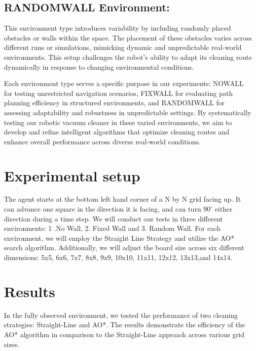 \documentclass{article}
\begin{document}
\subsection{RANDOMWALL Environment:} This environment type introduces variability by including randomly placed obstacles or walls within the space. The placement of these obstacles varies across different runs or simulations, mimicking dynamic and unpredictable real-world environments. This setup challenges the robot's ability to adapt its cleaning route dynamically in response to changing environmental conditions.


Each environment type serves a specific purpose in our experiments: NOWALL for testing unrestricted navigation scenarios, FIXWALL for evaluating path planning efficiency in structured environments, and RANDOMWALL for assessing adaptability and robustness in unpredictable settings. By systematically testing our robotic vacuum cleaner in these varied environments, we aim to develop and refine intelligent algorithms that optimize cleaning routes and enhance overall performance across diverse real-world conditions.

\section{Experimental setup}
The agent starts at the bottom left hand corner of a N by N grid facing up. 
It can advance one square in the direction it is facing, and can turn $90^\circ$ either direction during a time step. 
We will conduct our tests in three different environments: 1 .No Wall, 2. Fixed Wall and 3. Random Wall.
For each environment, we will employ the Straight Line Strategy and utilize the AO* search algorithm. Additionally, we will adjust the board size across six different dimensions: 5x5, 6x6, 7x7, 8x8, 9x9, 10x10, 11x11, 12x12, 13x13,and 14x14.

 



\section{Results}
In the fully observed environment, we tested the performance of two cleaning strategies: Straight-Line and AO*. The results demonstrate the efficiency of the AO* algorithm in comparison to the Straight-Line approach across various grid sizes.
\end{document}
